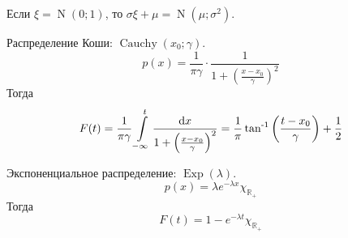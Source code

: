 \documentclass{article}
\begin{document}
    \begin{corollary}
        Если $\xi=\operatorname{N}(0;1)$, то $\sigma\xi+\mu=\operatorname{N}(\mu;\sigma^2)$.
    \end{corollary}
    \begin{example}
        Распределение Коши: $\operatorname{Cauchy}(x_0;\gamma)$.
        $$
        p(x)=\frac1{\pi\gamma}\cdot\frac1{1+\left(\frac{x-x_0}\gamma\right)^2}
        $$
        Тогда
        $$
        F(t)=\frac1{\pi\gamma}\int\limits_{-\infty}^t\frac{\mathrm dx}{1+\left(\frac{x-x_0}\gamma\right)^2}=\frac1\pi\operatorname{\tan^{-1}}\left(\frac{t-x_0}\gamma\right)+\frac12
        $$
    \end{example}
    \begin{example}
        Экспоненциальное распределение: $\operatorname{Exp}(\lambda)$.
        $$
        p(x)=\lambda e^{-\lambda x}\chi_{\mathbb R_+}
        $$
        Тогда
        $$
        F(t)=1-e^{-\lambda t}\chi_{\mathbb R_+}
        $$
    \end{example}
    
\end{document}
